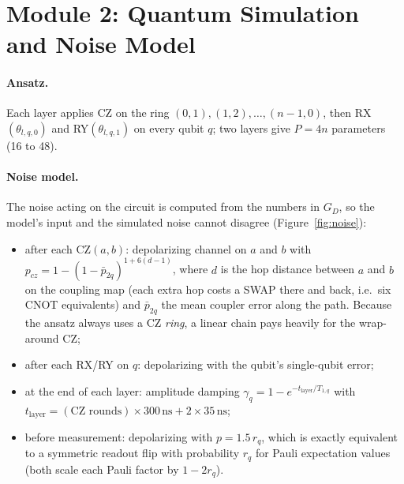 \documentclass{ssnreview}
\begin{document}
\section{Module 2: Quantum Simulation and Noise Model}

\paragraph{Ansatz.} Each layer applies CZ on the ring $(0,1),(1,2),\dots,(n{-}1,0)$, then
RX$(\theta_{l,q,0})$ and RY$(\theta_{l,q,1})$ on every qubit $q$; two layers give $P=4n$
parameters (16 to 48).

\paragraph{Noise model.} The noise acting on the circuit is computed from the numbers in $G_D$,
so the model's input and the simulated noise cannot disagree (Figure~\ref{fig:noise}):
\begin{itemize}
  \item after each CZ$(a,b)$: depolarizing channel on $a$ and $b$ with
        $p_{cz} = 1-(1-\bar p_{2q})^{1+6(d-1)}$, where $d$ is the hop distance between $a$ and
        $b$ on the coupling map (each extra hop costs a SWAP there and back, i.e.\ six CNOT
        equivalents) and $\bar p_{2q}$ the mean coupler error along the path. Because the ansatz
        always uses a CZ \emph{ring}, a linear chain pays heavily for the wrap-around CZ;
  \item after each RX/RY on $q$: depolarizing with the qubit's single-qubit error;
  \item at the end of each layer: amplitude damping $\gamma_q = 1-e^{-t_{\text{layer}}/T_{1,q}}$
        with $t_{\text{layer}} = (\text{CZ rounds})\times 300\,\text{ns} + 2\times 35\,\text{ns}$;
  \item before measurement: depolarizing with $p=1.5\,r_q$, which is exactly equivalent to a
        symmetric readout flip with probability $r_q$ for Pauli expectation values (both scale
        each Pauli factor by $1-2r_q$).
\end{itemize}
\end{document}
